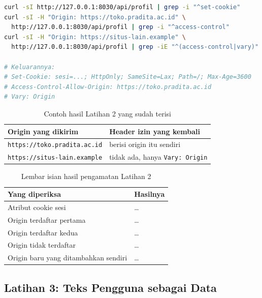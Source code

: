 \begin{lstlisting}[language=bash, caption={Membaca cookie dan izin lintas origin, tersedia di \berkas{sources/chapter07/aplikasi.py}}, label={lst:c7-lat2-jalan}]
curl -sI http://127.0.0.1:8030/api/profil | grep -i "^set-cookie"
curl -sI -H "Origin: https://toko.pradita.ac.id" \
  http://127.0.0.1:8030/api/profil | grep -i "^access-control"
curl -sI -H "Origin: https://situs-lain.example" \
  http://127.0.0.1:8030/api/profil | grep -iE "^(access-control|vary)"

# Keluarannya:
# Set-Cookie: sesi=...; HttpOnly; SameSite=Lax; Path=/; Max-Age=3600
# Access-Control-Allow-Origin: https://toko.pradita.ac.id
# Vary: Origin
\end{lstlisting}

\begin{table}[!htb]
  \centering
  \caption{Contoh hasil Latihan 2 yang sudah terisi}
  \label{tab:c7-lat2-contoh}
  \begin{tabularx}{\textwidth}{lX}
    \hline
    \textbf{Origin yang dikirim} & \textbf{Header izin yang kembali} \\
    \hline
    \texttt{https://toko.pradita.ac.id} & berisi origin itu sendiri \\
    \hline
    \texttt{https://situs-lain.example} & tidak ada, hanya \texttt{Vary: Origin} \\
    \hline
  \end{tabularx}
\end{table}

\begin{table}[!htb]
  \centering
  \caption{Lembar isian hasil pengamatan Latihan 2}
  \label{tab:c7-lat2-hasil}
  \begin{tabularx}{\textwidth}{lX}
    \hline
    \textbf{Yang diperiksa} & \textbf{Hasilnya} \\
    \hline
    Atribut cookie sesi & \dots \\
    \hline
    Origin terdaftar pertama & \dots \\
    \hline
    Origin terdaftar kedua & \dots \\
    \hline
    Origin tidak terdaftar & \dots \\
    \hline
    Origin baru yang ditambahkan sendiri & \dots \\
    \hline
  \end{tabularx}
\end{table}

\subsection*{Latihan 3: Teks Pengguna sebagai Data}

